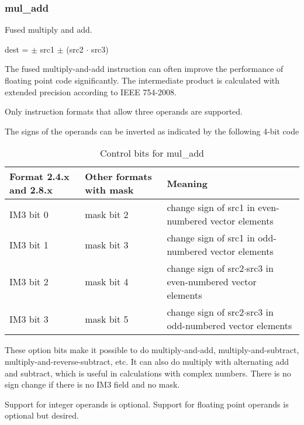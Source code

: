 \documentclass[forwardcom.tex]{subfiles}
\begin{document}
\subsubsection{mul\_add}  \label{mulAdd}
Fused multiply and add.
\vspace{2mm}

dest = $\pm$ src1 $\pm$ (src2 $\cdot$ src3)
\vspace{2mm}

The fused multiply-and-add instruction can often improve the performance of floating point code significantly. The intermediate product is calculated with extended precision according to IEEE 754-2008.
\vspace{2mm}

Only instruction formats that allow three operands are supported.
\vspace{2mm}

The signs of the operands can be inverted as indicated by the following 4-bit code

\begin{longtable} {|p{20mm}|p{20mm}|p{75mm}|}
\caption{Control bits for mul\_add} 
\label{table:ControlBitsForMulAdd} \\
\endfirsthead
\endhead
\hline
\bfseries Format 2.4.x and 2.8.x & \bfseries Other formats with mask & \bfseries Meaning   \\
\hline
IM3 bit 0 & mask bit 2 & change sign of src1 in even-numbered vector elements \\
IM3 bit 1 & mask bit 3 & change sign of src1 in odd-numbered vector elements \\
IM3 bit 2 & mask bit 4 & change sign of src2$\cdot$src3 in even-numbered vector elements \\
IM3 bit 3 & mask bit 5 & change sign of src2$\cdot$src3 in odd-numbered vector elements \\
\hline
\end{longtable}

\vspace{2mm}
These option bits make it possible to do multiply-and-add, multiply-and-subtract, multiply-and-reverse-subtract, etc. It can also do multiply with alternating add and subtract, which is useful in calculations with complex numbers. 
There is no sign change if there is no IM3 field and no mask. 

\vspace{2mm}
Support for integer operands is optional. Support for floating point operands is optional but desired.
\end{document}
